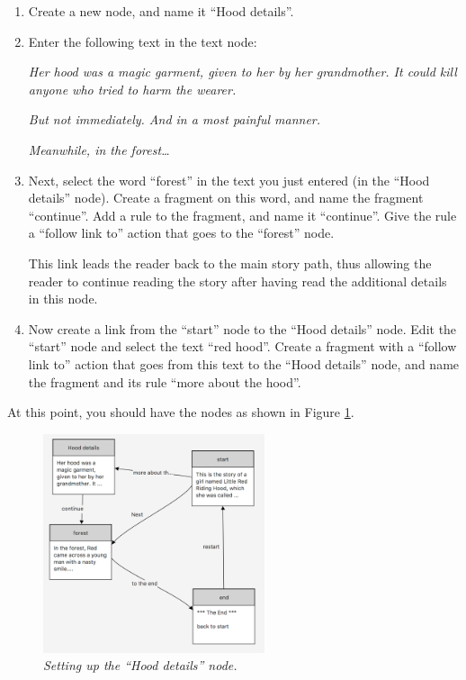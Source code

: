 \documentclass{article}
\begin{document}
\begin{enumerate}
  \item Create a new node, and name it ``Hood details''.
  \item Enter the following text in the text node:

\textit{Her hood was a magic garment, given to her by her grandmother.
It could kill anyone who tried to harm the wearer.}

\textit{But not immediately. And in a most painful manner.}

\textit{Meanwhile, in the forest\ldots}

\item Next, select the word ``forest'' in the text you just entered (in the
``Hood details'' node). Create a fragment on this word, and name the fragment
``continue''. Add a rule to the fragment, and name it ``continue''. Give the rule a ``follow link to'' action that goes to the ``forest'' node.

This link leads the reader back to the main story path, thus allowing the
reader to continue reading the story after having read the additional details in
this node.

\item Now create a link from the ``start'' node to the ``Hood details'' node.
Edit the ``start'' node and select the text ``red hood''. Create a fragment with a ``follow link to'' action that goes from this text to the ``Hood details'' node, and name the fragment and its rule ``more about the hood''.
\end{enumerate}

At this point, you should have the nodes as shown in Figure
\ref{fig:tut1:setting_up_hood_details}.
 
\begin{figure}[ht]
  \centering
  \includegraphics[width=6.5cm]{images/hypedyn-tutorial-1-figure-12}
  \caption{\textit{Setting up the ``Hood details'' node.}}
  \label{fig:tut1:setting_up_hood_details}
\end{figure} 
\end{document}
